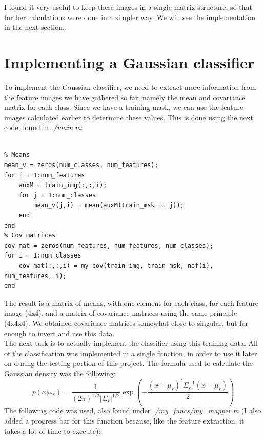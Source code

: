 \documentclass[a4paper, article, oneside, UKenglish]{memoir}
\newcommand{\0}{\mathbf{0}}
\newcommand{\1}{\mathbf{1}}
\begin{document}
I found it very useful to keep these images in a single matrix structure, so that further calculations were done in a simpler way. We will see the implementation in the next section.

\chapter{Implementing a Gaussian classifier}
To implement the Gaussian classifier, we need to extract more information from the feature images we have gathered so far, namely the mean and covariance matrix for each class. Since we have a training mask, we can use the feature images calculated earlier to determine these values. This is done using the next code, found in \textit{./main.m}:

 \begin{lstlisting}[frame=single]  % Inicia el bloque de código

% Means
mean_v = zeros(num_classes, num_features);
for i = 1:num_features
    auxM = train_img(:,:,i);
    for j = 1:num_classes
        mean_v(j,i) = mean(auxM(train_msk == j));
    end
end
% Cov matrices
cov_mat = zeros(num_features, num_features, num_classes);
for i = 1:num_classes
    cov_mat(:,:,i) = my_cov(train_img, train_msk, nof(i), num_features, i);
end

\end{lstlisting}

The result is a matrix of means, with one element for each class, for each feature image (4x4), and a matrix of covariance matrices using the same principle (4x4x4). We obtained covariance matrices somewhat close to singular, but far enough to invert and use this data. \\
The next task is to actually implement the classifier using this training data. All of the classification was implemented in a single function, in order to use it later on during the testing portion of this project. The formula used to calculate the Gaussian density was the following:\\
\[
p(x|\omega_s) = \frac{1}{(2\pi)^{1/2} |\Sigma_s|^{1/2}}\exp(-\frac{(x-\mu_s)^t\Sigma_s^{-1}(x-\mu_s)}{2})
\]
 The following code was used, also found under \textit{./my\_funcs/my\_mapper.m} (I also added a progress bar for this function because, like the feature extraction, it takes a lot of time to execute):
\end{document}
